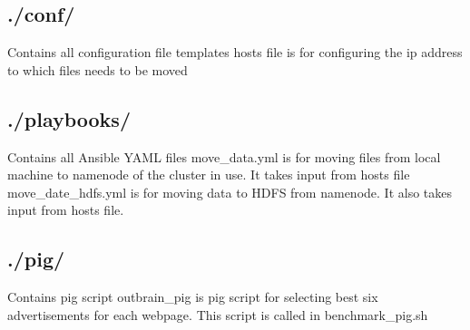 \documentclass[9pt,twocolumn,twoside]{../../styles/osajnl}
\begin{document}
\subsection{./conf/} Contains all configuration file templates
\newline hosts file is for configuring the ip address to which files needs to be moved
\subsection{./playbooks/} Contains all Ansible YAML files
\newline move\_data.yml is for moving files from local machine to namenode of the cluster in use. It takes input from hosts file
\newline move\_date\_hdfs.yml is for moving data to HDFS from namenode. It also takes input from hosts file.
\subsection{./pig/} Contains pig script
\newline outbrain\_pig is pig script for selecting best six advertisements for each webpage. This script is called in benchmark\_pig.sh
\end{document}
